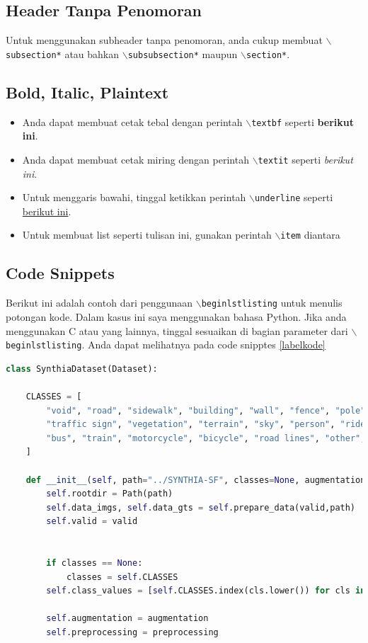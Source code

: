 \documentclass[11pt,a4paper]{article}
\begin{document}
\subsection*{Header Tanpa Penomoran}
     Untuk menggunakan subheader tanpa penomoran, anda cukup membuat $\backslash${\tt{subsection*}} atau bahkan  $\backslash${\tt{subsubsection*}} maupun $\backslash${\tt{section*}}.
    
\subsection{Bold, Italic, Plaintext}
\begin{itemize}
    \item Anda dapat membuat cetak tebal dengan perintah $\backslash${\tt{textbf}} seperti \textbf{berikut ini}.
    \item Anda dapat membuat cetak miring dengan perintah $\backslash${\tt{textit}} seperti \textit{berikut ini}. \item Untuk menggaris bawahi, tinggal ketikkan perintah $\backslash${\tt{underline}} seperti \underline{berikut ini}.
    \item Untuk membuat list seperti tulisan ini, gunakan perintah $\backslash${\tt{item}} diantara
\end{itemize}

\subsection{Code Snippets}
    Berikut ini adalah contoh dari penggunaan $\backslash${\tt{begin{lstlisting}}} untuk menulis potongan kode. Dalam kasus ini saya menggunakan bahasa Python. Jika anda menggunakan C atau yang lainnya, tinggal sesuaikan di bagian parameter dari $\backslash${\tt{begin{lstlisting}}}. Anda dapat melihatnya pada code snipptes \ref{labelkode}
    
    \begin{lstlisting}[language=Python, caption=Captionnya tulis di sini class,label={labelkode}]
    class SynthiaDataset(Dataset):

    CLASSES = [
        "void", "road", "sidewalk", "building", "wall", "fence", "pole", "traffic light", 
        "traffic sign", "vegetation", "terrain", "sky", "person", "rider", "car", "truck", 
        "bus", "train", "motorcycle", "bicycle", "road lines", "other", "road works"
    ]
    
    def __init__(self, path="../SYNTHIA-SF", classes=None, augmentation=None, preprocessing=None, valid=False):
        self.rootdir = Path(path)
        self.data_imgs, self.data_gts = self.prepare_data(valid,path)
        self.valid = valid

    
        if classes == None:
            classes = self.CLASSES 
        self.class_values = [self.CLASSES.index(cls.lower()) for cls in classes]
        
        self.augmentation = augmentation
        self.preprocessing = preprocessing
    \end{lstlisting}
\end{document}
